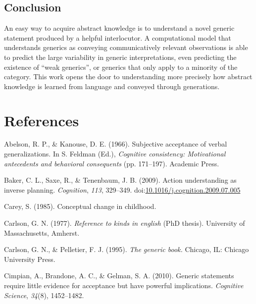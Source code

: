 \documentclass[floatsintext,doc]{apa6}
\begin{document}
\hypertarget{conclusion}{%
\subsection{Conclusion}\label{conclusion}}

An easy way to acquire abstract knowledge is to understand a novel generic statement produced by a helpful interlocutor. 
A computational model that understands generics as conveying communicatively relevant observations is able to predict the large variability in generic interpretations, even predicting the existence of \enquote{weak generics}, or generics that only apply to a minority of the category.
This work opens the door to understanding more precisely how abstract knowledge is learned from language and conveyed through generations.

\newpage

\hypertarget{references}{%
\section{References}\label{references}}

\hypertarget{refs}{}
\leavevmode\hypertarget{ref-Abelson1966}{}%
Abelson, R. P., \& Kanouse, D. E. (1966). Subjective acceptance of verbal generalizations. In S. Feldman (Ed.), \emph{Cognitive consistency: Motivational antecedents and behavioral consequents} (pp. 171--197). Academic Press.

\leavevmode\hypertarget{ref-Baker2009}{}%
Baker, C. L., Saxe, R., \& Tenenbaum, J. B. (2009). Action understanding as inverse planning. \emph{Cognition}, \emph{113}, 329--349. doi:\href{https://doi.org/10.1016/j.cognition.2009.07.005}{10.1016/j.cognition.2009.07.005}

\leavevmode\hypertarget{ref-carey1985conceptual}{}%
Carey, S. (1985). Conceptual change in childhood.

\leavevmode\hypertarget{ref-Carlson1977}{}%
Carlson, G. N. (1977). \emph{Reference to kinds in english} (PhD thesis). University of Massachusetts, Amherst.

\leavevmode\hypertarget{ref-Carlson1995}{}%
Carlson, G. N., \& Pelletier, F. J. (1995). \emph{The generic book.} Chicago, IL: Chicago University Press.

\leavevmode\hypertarget{ref-Cimpian2010}{}%
Cimpian, A., Brandone, A. C., \& Gelman, S. A. (2010). Generic statements require little evidence for acceptance but have powerful implications. \emph{Cognitive Science}, \emph{34}(8), 1452--1482.
\end{document}
